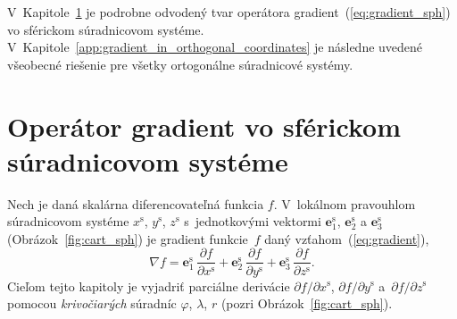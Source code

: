 \documentclass[a4paper,12pt]{book}
\let\vec\mathbf
\begin{document}
V~Kapitole~\ref{app:gradient_in_spherical_coordinates} je podrobne odvodený 
tvar operátora gradient~(\ref{eq:gradient_sph}) vo sférickom súradnicovom 
systéme.  V~Kapitole~\ref{app:gradient_in_orthogonal_coordinates} je následne 
uvedené všeobecné riešenie pre všetky ortogonálne súradnicové systémy.



\section{Operátor gradient vo sférickom súradnicovom systéme}
\label{app:gradient_in_spherical_coordinates}

Nech je daná skalárna diferencovateľná funkcia $f$.  V~lokálnom pravouhlom 
súradnicovom systéme $x^{\mathrm{s}}$, $y^{\mathrm{s}}$, $z^{\mathrm{s}}$ 
s~jednotkovými vektormi $\vec e^\mathrm{s}_1$, $\vec e^\mathrm{s}_2$ a $\vec 
e^\mathrm{s}_3$ (Obrázok~\ref{fig:cart_sph}) je gradient funkcie~$f$ daný 
vzťahom~(\ref{eq:gradient}),
%
\begin{equation}
\nabla f = \vec e^\mathrm{s}_1 \, \frac{\partial f}{\partial x^{\mathrm{s}}} 
+ \vec e^\mathrm{s}_2 \, \frac{\partial f}{\partial y^{\mathrm{s}}} + \vec 
e^\mathrm{s}_3 \, \frac{\partial f}{\partial z^{\mathrm{s}}}{.}
\end{equation}
%
Cieľom tejto kapitoly je vyjadriť parciálne derivácie $\partial f \slash 
\partial x^{\mathrm{s}}$, $\partial f \slash \partial y^{\mathrm{s}}$ 
a~$\partial f \slash \partial z^{\mathrm{s}}$ pomocou \emph{krivočiarých} 
súradníc $\varphi$, $\lambda$, $r$ (pozri Obrázok~\ref{fig:cart_sph}).
\end{document}
